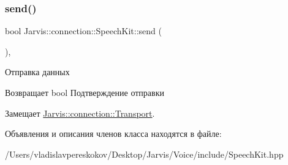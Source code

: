 \subsubsection{\texorpdfstring{send()}{send()}}
{\footnotesize\ttfamily bool Jarvis\+::connection\+::\+Speech\+Kit\+::send (\begin{DoxyParamCaption}{ }\end{DoxyParamCaption})\hspace{0.3cm}{\ttfamily [override]}, {\ttfamily [virtual]}}



Отправка данных 

\begin{DoxyReturn}{Возвращает}
bool Подтверждение отправки 
\end{DoxyReturn}


Замещает \hyperlink{classJarvis_1_1connection_1_1Transport_ad0116f6773802fd75ea6795313051a96}{Jarvis\+::connection\+::\+Transport}.



Объявления и описания членов класса находятся в файле\+:\begin{DoxyCompactItemize}
\item 
/\+Users/vladislavpereskokov/\+Desktop/\+Jarvis/\+Voice/include/Speech\+Kit.\+hpp\end{DoxyCompactItemize}
